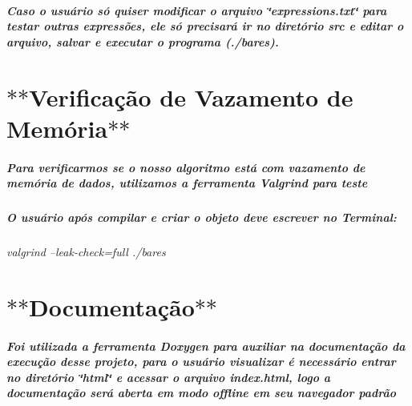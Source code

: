 \subparagraph*{Caso o usuário só quiser modificar o arquivo \char`\"{}expressions.\+txt\char`\"{} para testar outras expressões, ele só precisará ir no diretório {\itshape src} e editar o arquivo, salvar e executar o programa (./bares). }

\section*{$\ast$$\ast$\+Verificação de Vazamento de Memória$\ast$$\ast$ }

\subparagraph*{Para verificarmos se o nosso algoritmo está com vazamento de memória de dados, utilizamos a ferramenta Valgrind para teste}

\subparagraph*{O usuário após compilar e criar o objeto deve escrever no Terminal\+:}

{\itshape valgrind --leak-\/check=full ./bares}

\section*{$\ast$$\ast$\+Documentação$\ast$$\ast$}

\subparagraph*{Foi utilizada a ferramenta Doxygen para auxiliar na documentação da execução desse projeto, para o usuário visualizar é necessário entrar no diretório \char`\"{}html\char`\"{} e acessar o arquivo index.\+html, logo a documentação será aberta em modo offline em seu navegador padrão}